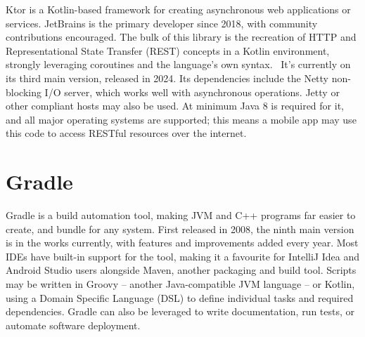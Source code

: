 Ktor is a Kotlin-based framework for creating asynchronous web applications or services. JetBrains is the primary developer since 2018, with community contributions encouraged. The bulk of this library is the recreation of HTTP and Representational State Transfer (REST) concepts in a Kotlin environment, strongly leveraging coroutines and the language's own syntax.~\cite{KtorDocs} It's currently on its third main version, released in 2024. Its dependencies include the Netty non-blocking I/O server, which works well with asynchronous operations. Jetty or other compliant hosts may also be used. At minimum Java 8 is required for it, and all major operating systems are supported; this means a mobile app may use this code to access RESTful resources over the internet.



\section{Gradle}

Gradle is a build automation tool, making JVM and C++ programs far easier to create, and bundle for any system.\cite{GradleDocs} First released in 2008, the ninth main version is in the works currently, with features and improvements added every year. Most IDEs have built-in support for the tool, making it a favourite for IntelliJ Idea and Android Studio users alongside Maven, another packaging and build tool. Scripts may be written in Groovy -- another Java-compatible JVM language -- or Kotlin, using a Domain Specific Language (DSL) to define individual tasks and required dependencies. Gradle can also be leveraged to write documentation, run tests, or automate software deployment.